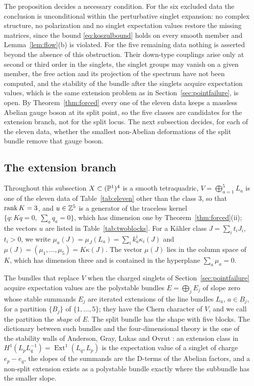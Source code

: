 \begin{remark}\label{rem:elevenscope}
The proposition decides a necessary condition. For the six excluded data
the conclusion is unconditional within the perturbative singlet
expansion: no complex structure, no polarization and no singlet
expectation values restore the missing matrices, since the bound
\eqref{eq:koszulbound} holds on every smooth member and
Lemma~\ref{lem:flow}(b) is violated. For the five remaining data nothing
is asserted beyond the absence of this obstruction. Their down-type
couplings arise only at second or third order in the singlets, the
singlet groups may vanish on a given member, the free action and its
projection of the spectrum have not been computed, and the stability of
the bundle after the singlets acquire expectation values, which is the
same extension problem as in Section~\ref{sec:pointfailure}, is open.
By Theorem~\ref{thm:forced} every one of the eleven data keeps a massless
Abelian gauge boson at its split point, so the five classes are candidates
for the extension branch, not for the split locus. The next subsection
decides, for each of the eleven data, whether the smallest non-Abelian
deformations of the split bundle remove that gauge boson.
\end{remark}

\subsection{The extension branch}\label{sec:extbranch}
Throughout this subsection $X\subset(\mathbb{P}^1)^4$ is a smooth tetraquadric,
$V=\bigoplus_{a=1}^5L_a$ is one of the eleven data of
Table~\ref{tab:eleven} other than the class $3$, so that $\operatorname{rank} K=3$, and
$u\in\mathbb{Z}^5$ is a generator of the traceless kernel
$\{q:Kq=0,\ \sum_aq_a=0\}$, which has dimension one by
Theorem~\ref{thm:forced}(ii); the vectors $u$ are listed in
Table~\ref{tab:twoblocks}. For a K\"ahler class $J=\sum_it_iJ_i$,
$t_i>0$, we write $\mu_a(J)=\mu_J(L_a)=\sum_ik_a^i\kappa_i(J)$ and
$\mu(J)=(\mu_1,\dots,\mu_5)=K\kappa(J)$. The vector $\mu(J)$ lies in the
column space of $K$, which has dimension three and is contained in the
hyperplane $\sum_a\mu_a=0$.

The bundles that replace $V$ when the charged singlets of
Section~\ref{sec:pointfailure} acquire expectation values are the
polystable bundles $E=\bigoplus_jE_j$ of slope zero whose stable summands
$E_j$ are iterated extensions of the line bundles $L_a$, $a\in B_j$, for a
partition $\{B_j\}$ of $\{1,\dots,5\}$; they have the Chern character of
$V$, and we call the partition the \emph{shape} of $E$. The split bundle
has the shape with five blocks. The dictionary between such bundles and the
four-dimensional theory is the one of the stability walls of Anderson,
Gray, Lukas and Ovrut \cite{AGLO09,AGL09}: an extension class in
$H^1(L_pL_q^{-1})=\operatorname{Ext}^1(L_q,L_p)$ is the expectation value
of a singlet of charge $e_p-e_q$, the slopes of the summands are the
D-terms of the Abelian factors, and a non-split extension exists as a
polystable bundle exactly where the subbundle has the smaller slope.

